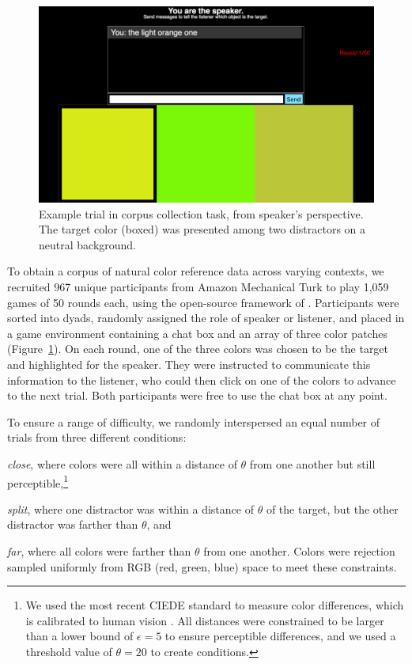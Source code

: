 \documentclass[11pt,letterpaper]{article}
\renewcommand{\|}{\mid}
\newcommand{\figref}[1]{Figure~\ref{#1}}
\newcommand{\cond}{\emph}
\begin{document}
\begin{figure}
\includegraphics[scale = .2]{figures/speakerView.png}
\caption{Example trial in corpus collection task, from speaker's
  perspective. The target color (boxed) was presented among two distractors on a neutral background.}
\label{fig:taskScreenshot}
\end{figure}
To obtain a corpus of natural color reference data across varying
contexts, we recruited 967 unique participants from Amazon
Mechanical Turk to play 1,059 games of 50 rounds each, using the open-source framework of
.  
Participants were sorted into dyads, randomly assigned the role of speaker or listener,
and placed in a game environment containing a chat box and an array of three color patches
(\figref{fig:taskScreenshot}). 
On each round, one of the three colors was chosen to be the target and
highlighted for the speaker. They were instructed to communicate this
information to the listener, who could then click on one of the colors
to advance to the next trial. Both participants were free to use the
chat box at any point.


To ensure a range of difficulty, we randomly interspersed an equal
number of trials from three different conditions:
%
\begin{enumerate*}[label=(\arabic*)]%
\item \cond{close}, where colors were all within a distance of
  $\theta$ from one another but still perceptible,\footnote{We used the
    most recent CIEDE standard to measure color differences, which is
    calibrated to human vision \cite{SharmaWuDalal05_DeltaE}. All
    distances were constrained to be larger than a lower bound of
    $\epsilon = 5$ to ensure perceptible differences, and we used a
    threshold value of $\theta = 20$ to create conditions.} 
\item \cond{split}, where one distractor was within a distance of
  $\theta$ of the target, but the other distractor was farther than
  $\theta$, and
\item \cond{far}, where all colors were farther than $\theta$ from one
  another. Colors were rejection sampled uniformly from RGB (red,
  green, blue) space to meet these constraints.
\end{enumerate*}
\end{document}
